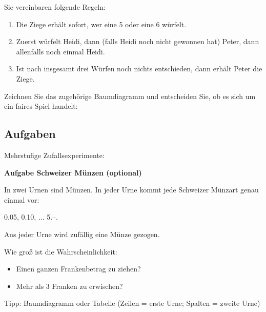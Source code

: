Sie vereinbaren folgende Regeln:

\begin{enumerate}
\item Die Ziege erhält sofort, wer eine 5 oder eine 6 würfelt.
\item Zuerst würfelt Heidi, dann (falls Heidi noch nicht gewonnen hat) Peter, dann allenfalls noch einmal Heidi.
\item Ist nach insgesamt drei Würfen noch nichts entschieden, dann erhält Peter die Ziege.
\end{enumerate}


Zeichnen Sie das zugehörige Baumdiagramm und entscheiden Sie, ob es sich um ein faires Spiel handelt:



\subsection*{Aufgaben}

Mehrstufige Zufallsexperimente:

\newpage

\textbf{Aufgabe Schweizer Münzen (optional)}

In zwei Urnen sind Münzen. In jeder Urne kommt jede Schweizer Münzart
genau einmal vor:

0.05, 0.10, ... 5.--.

Aus jeder Urne wird zufällig eine Münze gezogen.

Wie groß ist die Wahrscheinlichkeit:
\begin{itemize}
\item Einen ganzen Frankenbetrag zu ziehen?
\item Mehr als 3 Franken zu erwischen?
\end{itemize}

  Tipp: Baumdiagramm oder Tabelle (Zeilen = erste Urne; Spalten =
  zweite Urne)

